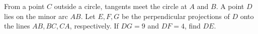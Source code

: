 From a point $C$ outside a circle, tangents meet the circle at $A$ and $B$. A point $D$ lies on the minor arc $AB$. Let $E,F,G$ be the perpendicular projections of $D$ onto the lines $AB,BC,CA$, respectively. If $DG=9$ and $DF=4$, find $DE$.
